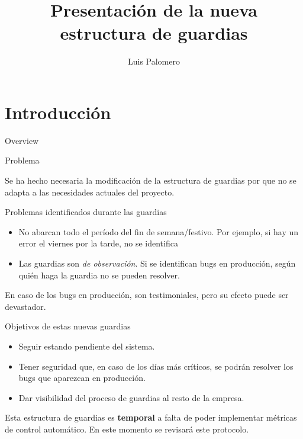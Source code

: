 \documentclass[12pt, aspectratio=169]{beamer} %
\title{Presentación de la nueva estructura de guardias}
\author{Luis Palomero}
\begin{document}
\frame{\titlepage}

\section{Introducción}


\begin{frame}{Overview}
\tableofcontents
\end{frame}

\begin{frame}{Problema}

  Se ha hecho necesaria la modificación de la estructura de guardias por que no se adapta a las necesidades actuales del proyecto.

  \begin{block}{Problemas identificados durante las guardias}
    \begin{itemize}
    \item No abarcan todo el período del fin de semana/festivo. Por ejemplo, si hay un error el viernes por la tarde, no se identifica
    \item Las guardias son \textit{de observación}. Si se identifican bugs en producción, según quién haga la guardia no se pueden resolver.
    \end{itemize}

    En caso de los bugs en producción, son testimoniales, pero su efecto puede ser devastador.
  \end{block}

\end{frame}

\begin{frame}{Objetivos de estas nuevas guardias}
  
    \begin{itemize}
    \item Seguir estando pendiente del sistema.
    \item Tener seguridad que, en caso de los días más críticos, se podrán resolver los bugs que aparezcan en producción.
    \item Dar visibilidad del proceso de guardias al resto de la empresa.
    \end{itemize}

Esta estructura de guardias es \textbf{temporal} a falta de poder implementar métricas de control automático. En este momento se revisará este protocolo.


\end{frame}
\end{document}
